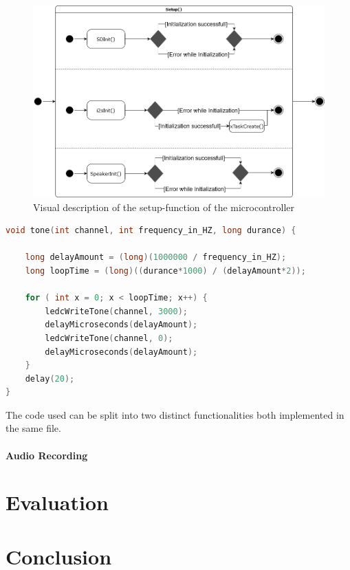\begin{figure}[t]
	\includegraphics[width=\linewidth]{Media/controller_setup.png}
	\caption{Visual description of the setup-function of the microcontroller}
	\label{fig:cntrlr_stp}
\end{figure}

\begin{lstlisting}[language=c++, caption=Function used to generate Audio output]
void tone(int channel, int frequency_in_HZ, long durance) {

	long delayAmount = (long)(1000000 / frequency_in_HZ);
	long loopTime = (long)((durance*1000) / (delayAmount*2));

	for ( int x = 0; x < loopTime; x++) {
		ledcWriteTone(channel, 3000);
		delayMicroseconds(delayAmount);
		ledcWriteTone(channel, 0);
		delayMicroseconds(delayAmount);
	}
	delay(20);
}
\end{lstlisting}

The code used can be split into two distinct functionalities both implemented in the same file.




\paragraph{Audio Recording}

\section{Evaluation}
\section{Conclusion}
